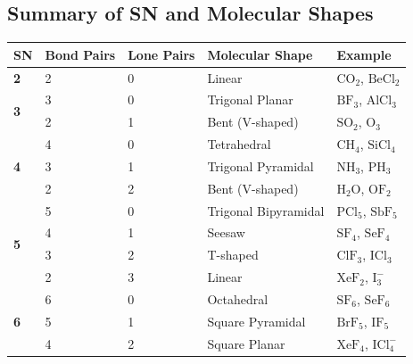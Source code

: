 \documentclass[12pt,a4paper]{article}
\begin{document}
\subsection{Summary of SN and Molecular Shapes}
\par\vspace{4pt}\noindent
\begin{tabularx}{\linewidth}{|B{1.6cm}|B{2.2cm}|B{2.0cm}|B{2.8cm}|Y|}
\hline
\textbf{SN} & \textbf{Bond Pairs} & \textbf{Lone Pairs} & \textbf{Molecular Shape} & \textbf{Example} \\
\hline
\textbf{2} & 2 & 0 & Linear & $\text{CO}_2$, $\text{BeCl}_2$ \\
\hline
{} & 3 & 0 & Trigonal Planar & $\text{BF}_3$, $\text{AlCl}_3$ \\
 & 2 & 1 & Bent (V-shaped) & $\text{SO}_2$, $\text{O}_3$ \\
\hline
{} & 4 & 0 & Tetrahedral & $\text{CH}_4$, $\text{SiCl}_4$ \\
 & 3 & 1 & Trigonal Pyramidal & $\text{NH}_3$, $\text{PH}_3$ \\
 & 2 & 2 & Bent (V-shaped) & $\text{H}_2\text{O}$, $\text{OF}_2$ \\
\hline
{} & 5 & 0 & Trigonal Bipyramidal & $\text{PCl}_5$, $\text{SbF}_5$ \\
 & 4 & 1 & Seesaw & $\text{SF}_4$, $\text{SeF}_4$ \\
 & 3 & 2 & T-shaped & $\text{ClF}_3$, $\text{ICl}_3$ \\
 & 2 & 3 & Linear & $\text{XeF}_2$, $\text{I}_3^-$ \\
\hline
{} & 6 & 0 & Octahedral & $\text{SF}_6$, $\text{SeF}_6$ \\
 & 5 & 1 & Square Pyramidal & $\text{BrF}_5$, $\text{IF}_5$ \\
 & 4 & 2 & Square Planar & $\text{XeF}_4$, $\text{ICl}_4^-$ \\
\hline
\end{tabularx}
\vspace{6pt}
\end{document}
